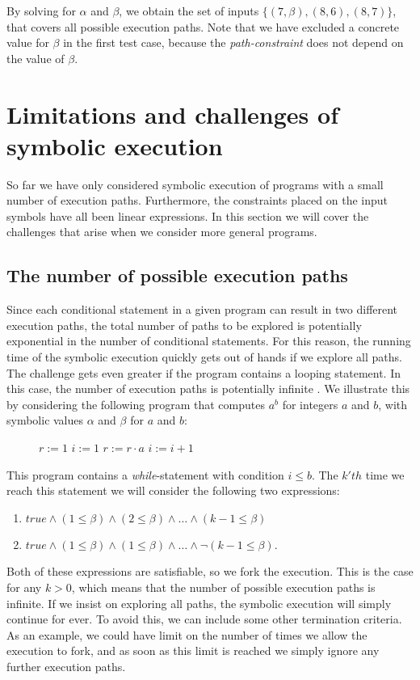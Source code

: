 	By solving for $\alpha$ and $\beta$, we obtain the set of inputs $\{(7, \beta), (8,6), (8, 7)\}$, that covers all possible execution paths. Note that we have excluded a concrete value for $\beta$ in the first test case, because the \emph{path-constraint} does not depend on the value of $\beta$. 
	 
	\fi 
\section{Limitations and challenges of symbolic execution}
	So far we have only considered symbolic execution of programs with a small number of execution paths. Furthermore, the constraints placed on the input symbols have all been linear expressions.
	In this section we will cover the challenges that arise when we consider more general programs.
	
	\subsection{The number of possible execution paths} 
		Since each conditional statement in a given program can result in two different execution paths, the total number of paths to be explored is potentially exponential in the number of conditional statements. 
		For this reason, the running time of the symbolic execution quickly gets out of hands if we explore all paths. 
		 The challenge gets even greater if the program contains a looping statement. In this case, the number of execution paths is potentially infinite \citep{CadarSen13}.
		  We illustrate this by considering the following program that computes $a^b$ for integers $a$ and $b$, with symbolic values $\alpha$ and $\beta$ for $a$ and $b$:
		\begin{figure}[!h]
			\begin{algorithmic}
				\State $r := 1$
				\State $i := 1$
					\State $ r := r\cdot a$
					\State $ i := i + 1$
				\EndWhile
				\State {}
				\EndProcedure
			\end{algorithmic}
		\end{figure}
		\pow{}
		
	This program contains a \textsl{while}-statement with condition $i \leq b$. The $k'th$ time we reach this statement we will consider the following two expressions:
	\begin{enumerate}
		\item $true \land (1 \leq \beta) \land (2 \leq \beta) \land \ldots \land (k-1 \leq \beta) $
		\item $true \land (1 \leq \beta) \land (1 \leq \beta) \land \ldots \land \neg (k-1 \leq \beta) $.
	\end{enumerate}
	Both of these expressions are satisfiable, so we fork the execution. This is the case for any $k > 0$, which means that the number of possible execution paths is infinite. If we insist on exploring all paths, the symbolic execution will simply continue for ever. To avoid this, we can include some other termination criteria. As an example, we could have limit on the number of times we allow the execution to fork, and as soon as this limit is reached we simply ignore any further execution paths.
	
